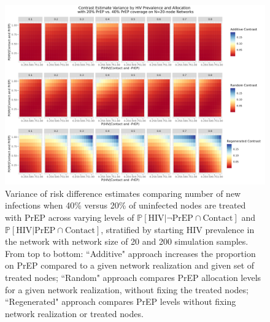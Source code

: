 \documentclass{article}
\theoremstyle{definition}
\begin{document}
\begin{figure}[H]
    \centering
    \includegraphics[width=\linewidth]{Corrected Figures/HIV Prevalence Variance Plot.png}
    \caption{Variance of risk difference estimates comparing number of new infections when 40\% versus 20\% of uninfected nodes are treated with PrEP across varying levels of $\mathbb{P}\left[\text{HIV} \vert \neg \text{PrEP} \cap \text{Contact}\right]$ and $\mathbb{P}\left[\text{HIV} \vert \text{PrEP} \cap \text{Contact}\right]$, stratified by starting HIV prevalence in the network with network size of 20 and 200 simulation samples.
    From top to bottom: ``Additive" approach increases the proportion on PrEP compared to a given network realization and given set of treated nodes; ``Random" approach compares PrEP allocation levels for a given network realization, without fixing the treated nodes; ``Regenerated" approach compares PrEP levels without fixing network realization or treated nodes.}
    \label{fig:Figure 9}
\end{figure}
\end{document}
